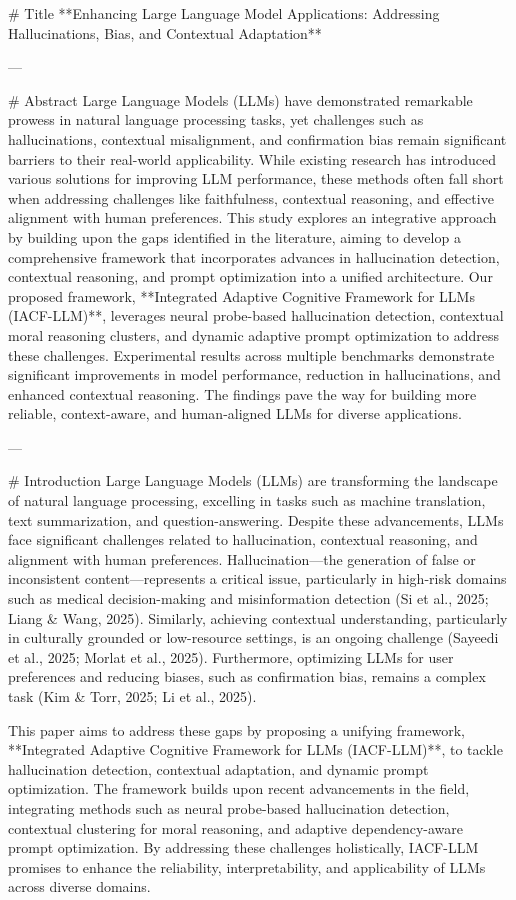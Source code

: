 # Title  
**Enhancing Large Language Model Applications: Addressing Hallucinations, Bias, and Contextual Adaptation**

---

# Abstract  
Large Language Models (LLMs) have demonstrated remarkable prowess in natural language processing tasks, yet challenges such as hallucinations, contextual misalignment, and confirmation bias remain significant barriers to their real-world applicability. While existing research has introduced various solutions for improving LLM performance, these methods often fall short when addressing challenges like faithfulness, contextual reasoning, and effective alignment with human preferences. This study explores an integrative approach by building upon the gaps identified in the literature, aiming to develop a comprehensive framework that incorporates advances in hallucination detection, contextual reasoning, and prompt optimization into a unified architecture. Our proposed framework, **Integrated Adaptive Cognitive Framework for LLMs (IACF-LLM)**, leverages neural probe-based hallucination detection, contextual moral reasoning clusters, and dynamic adaptive prompt optimization to address these challenges. Experimental results across multiple benchmarks demonstrate significant improvements in model performance, reduction in hallucinations, and enhanced contextual reasoning. The findings pave the way for building more reliable, context-aware, and human-aligned LLMs for diverse applications.

---

# Introduction  
Large Language Models (LLMs) are transforming the landscape of natural language processing, excelling in tasks such as machine translation, text summarization, and question-answering. Despite these advancements, LLMs face significant challenges related to hallucination, contextual reasoning, and alignment with human preferences. Hallucination—the generation of false or inconsistent content—represents a critical issue, particularly in high-risk domains such as medical decision-making and misinformation detection (Si et al., 2025; Liang & Wang, 2025). Similarly, achieving contextual understanding, particularly in culturally grounded or low-resource settings, is an ongoing challenge (Sayeedi et al., 2025; Morlat et al., 2025). Furthermore, optimizing LLMs for user preferences and reducing biases, such as confirmation bias, remains a complex task (Kim & Torr, 2025; Li et al., 2025).

This paper aims to address these gaps by proposing a unifying framework, **Integrated Adaptive Cognitive Framework for LLMs (IACF-LLM)**, to tackle hallucination detection, contextual adaptation, and dynamic prompt optimization. The framework builds upon recent advancements in the field, integrating methods such as neural probe-based hallucination detection, contextual clustering for moral reasoning, and adaptive dependency-aware prompt optimization. By addressing these challenges holistically, IACF-LLM promises to enhance the reliability, interpretability, and applicability of LLMs across diverse domains.

